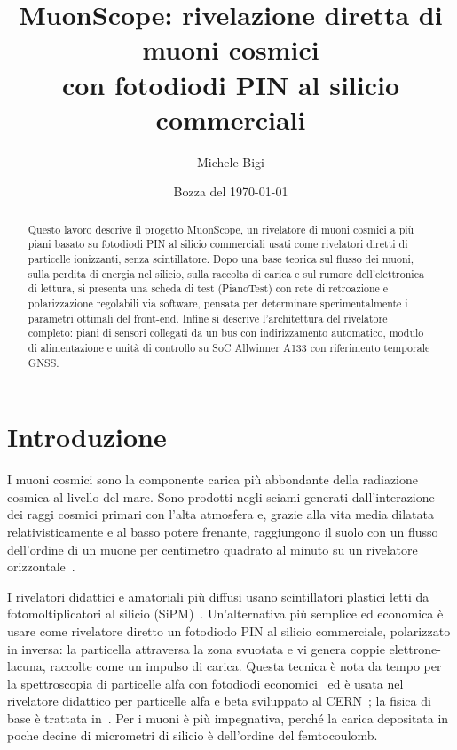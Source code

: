 \documentclass[11pt,a4paper]{article}
\title{MuonScope: rivelazione diretta di muoni cosmici\\con fotodiodi PIN al silicio commerciali}
\author{Michele Bigi}
\date{Bozza del \today}
\begin{document}
\maketitle

\begin{abstract}
Questo lavoro descrive il progetto MuonScope, un rivelatore di muoni cosmici a più piani basato su fotodiodi PIN al silicio commerciali usati come rivelatori diretti di particelle ionizzanti, senza scintillatore. Dopo una base teorica sul flusso dei muoni, sulla perdita di energia nel silicio, sulla raccolta di carica e sul rumore dell'elettronica di lettura, si presenta una scheda di test (PianoTest) con rete di retroazione e polarizzazione regolabili via software, pensata per determinare sperimentalmente i parametri ottimali del front-end. Infine si descrive l'architettura del rivelatore completo: piani di sensori collegati da un bus con indirizzamento automatico, modulo di alimentazione e unità di controllo su SoC Allwinner A133 con riferimento temporale GNSS.
\end{abstract}

\tableofcontents

\section{Introduzione}

I muoni cosmici sono la componente carica più abbondante della radiazione cosmica al livello del mare. Sono prodotti negli sciami generati dall'interazione dei raggi cosmici primari con l'alta atmosfera e, grazie alla vita media dilatata relativisticamente e al basso potere frenante, raggiungono il suolo con un flusso dell'ordine di un muone per centimetro quadrato al minuto su un rivelatore orizzontale~\cite{pdg2024,gaisser2016}.

I rivelatori didattici e amatoriali più diffusi usano scintillatori plastici letti da fotomoltiplicatori al silicio (SiPM)~\cite{axani2017,axani2018}. Un'alternativa più semplice ed economica è usare come rivelatore diretto un fotodiodo PIN al silicio commerciale, polarizzato in inversa: la particella attraversa la zona svuotata e vi genera coppie elettrone-lacuna, raccolte come un impulso di carica. Questa tecnica è nota da tempo per la spettroscopia di particelle alfa con fotodiodi economici~\cite{gooda1987} ed è usata nel rivelatore didattico per particelle alfa e beta sviluppato al CERN~\cite{keller2019,physicsopenlab2020}; la fisica di base è trattata in~\cite{knoll2010}. Per i muoni è più impegnativa, perché la carica depositata in poche decine di micrometri di silicio è dell'ordine del femtocoulomb.
\end{document}
